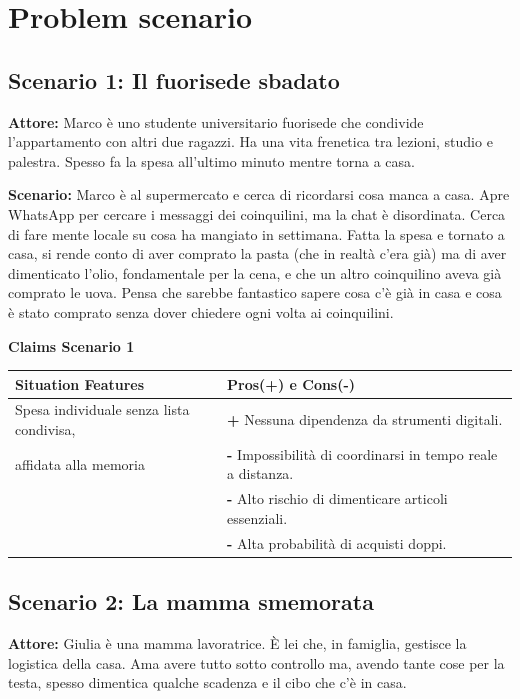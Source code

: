 \documentclass[12pt,a4paper]{article}
\begin{document}
\section{Problem scenario}

\subsection{Scenario 1: Il fuorisede sbadato}
\textbf{Attore:} Marco è uno studente universitario fuorisede che condivide l'appartamento con altri due ragazzi. Ha una vita frenetica tra lezioni, studio e palestra. Spesso fa la spesa all'ultimo minuto mentre torna a casa.

\textbf{Scenario:} Marco è al supermercato e cerca di ricordarsi cosa manca a casa. Apre WhatsApp per cercare i messaggi dei coinquilini, ma la chat è disordinata. Cerca di fare mente locale su cosa ha mangiato in settimana. Fatta la spesa e tornato a casa, si rende conto di aver comprato la pasta (che in realtà c'era già) ma di aver dimenticato l'olio, fondamentale per la cena, e che un altro coinquilino aveva già comprato le uova. Pensa che sarebbe fantastico sapere cosa c'è già in casa e cosa è stato comprato senza dover chiedere ogni volta ai coinquilini.

\vspace{0.5cm}
\noindent\textbf{Claims Scenario 1}

\begin{table}[h]
\centering
\begin{tabularx}{\textwidth}{|l|X|}
\hline
\textbf{Situation Features} & \textbf{Pros(+) e Cons(-)} \\
\hline
Spesa individuale senza lista condivisa, & \textbf{+} Nessuna dipendenza da strumenti digitali. \\
affidata alla memoria & \textbf{-} Impossibilità di coordinarsi in tempo reale a distanza. \\
& \textbf{-} Alto rischio di dimenticare articoli essenziali. \\
& \textbf{-} Alta probabilità di acquisti doppi. \\
\hline
\end{tabularx}
\end{table}

\subsection{Scenario 2: La mamma smemorata}
\textbf{Attore:} Giulia è una mamma lavoratrice. È lei che, in famiglia, gestisce la logistica della casa. Ama avere tutto sotto controllo ma, avendo tante cose per la testa, spesso dimentica qualche scadenza e il cibo che c'è in casa.
\end{document}
